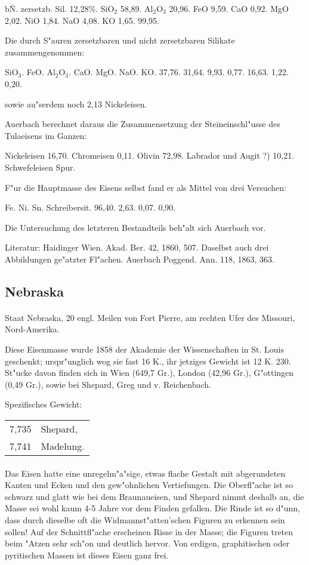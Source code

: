 \documentclass[a4paper, 11pt, oneside]{article}
\begin{document}
b\. N. zersetzb. Sil. 12,28\%.  
SiO$_{2}$ 58,89.  
Al$_{2}$O$_{3}$ 20,96.  
FeO 9,59.  
CaO 0,92.  
MgO 2,02.  
NiO 1,84.  
NaO 4,08.  
KO 1,65.  
99,95.

Die durch S"auren zersetzbaren und nicht zersetzbaren Silikate zusammengenommen:

SiO$_{3}$. FeO. Al$_{2}$O$_{3}$. CaO. MgO. NaO. KO.  
37,76. 31,64. 9,93. 0,77. 16,63. 1,22. 0,20.

sowie au"serdem noch 2,13 Nickeleisen.

Auerbach berechnet daraus die Zusammensetzung der Steineinschl"usse des Tulaeisens im Ganzen:

Nickeleisen 16,70.  
Chromeisen 0,11.  
Olivin 72,98.  
Labrador und Augit ?) 10,21.  
Schwefeleisen Spur.

F"ur die Hauptmasse des Eisens selbst fand er als Mittel von drei Versuchen:

Fe. Ni. Sn. Schreibersit.  
96,40. 2,63. 0,07. 0,90.

Die Untersuchung des letzteren Bestandteils beh"alt sich Auerbach vor.

Literatur: Haidinger Wien. Akad. Ber. 42, 1860, 507. Daselbst auch drei Abbildungen ge"atzter Fl"achen. Auerbach Poggend. Ann. 118, 1863, 363.

\subsection{Nebraska}
\normalsize
\paragraph{}
Staat Nebraska, 20 engl. Meilen von Fort Pierre, am rechten Ufer des Missouri, Nord-Amerika.

Diese Eisenmasse wurde 1858 der Akademie der Wissenschaften in St. Louis geschenkt; urspr"unglich wog sie fast 16 K., ihr jetziges Gewicht ist 12 K. 230. St"ucke davon finden sich in Wien (649,7 Gr.), London (42,96 Gr.), G"ottingen (0,49 Gr.), sowie bei Shepard, Greg und v. Reichenbach.

Spezifisches Gewicht:  
\begin{table}[!ht]
    \centering
    \begin{tabular}{l l}
        7,735 & Shepard,\\
        7,741 & Madelung.
    \end{tabular}
\end{table}
\paragraph{}
Das Eisen hatte eine unregelm"a"sige, etwas flache Gestalt mit abgerundeten Kanten und Ecken und den gew"ohnlichen Vertiefungen. Die Oberfl"ache ist so schwarz und glatt wie bei dem Braunaueisen, und Shepard nimmt deshalb an, die Masse sei wohl kaum 4-5 Jahre vor dem Finden gefallen. Die Rinde ist so d"unn, dass durch dieselbe oft die Widmannst"atten'schen Figuren zu erkennen sein sollen! Auf der Schnittfl"ache erscheinen Risse in der Masse; die Figuren treten beim "Atzen sehr sch"on und deutlich hervor. Von erdigen, graphitischen oder pyritischen Massen ist dieses Eisen ganz frei.
\end{document}
